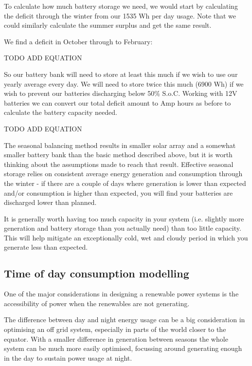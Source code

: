 \documentclass{article}
\theoremstyle{definition}
\theoremstyle{definition}
\theoremstyle{remark}
\begin{document}
    To calculate how much battery storage we need, we would start by calculating the deficit through the winter from our 1535 Wh per day usage. Note that we could similarly calculate the summer surplus and get the same result.

    We find a deficit in October through to February:

    TODO ADD EQUATION

    So our battery bank will need to store at least this much if we wish to use our yearly average every day. We will need to store twice this much (6900 Wh) if we wish to prevent our batteries discharging below 50\% S.o.C. Working with 12V batteries we can convert our total deficit amount to Amp hours as before to calculate the battery capacity needed.

    TODO ADD EQUATION

    The seasonal balancing method results in smaller solar array and a somewhat smaller battery bank than the basic method described above, but it is worth thinking about the assumptions made to reach that result. Effective seasonal storage relies on consistent average energy generation and consumption through the winter - if there are a couple of days where generation is lower than expected and/or consumption is higher than expected, you will find your batteries are discharged lower than planned. 

    It is generally worth having too much capacity in your system (i.e. slightly more generation and battery storage than you actually need) than too little capacity. This will help mitigate an exceptionally cold, wet and cloudy period in which you generate less than expected. 
  

  \subsection{Time of day consumption modelling} %
  \label{sub:time_of_day_consumption_modelling}

    One of the major considerations in designing a renewable power systems is the accessibility of power when the renewables are not generating.

    The difference between day and night energy usage can be a big consideration in optimising an off grid system, especially in parts of the world closer to the equator. With a smaller difference in generation between seasons the whole system can be much more easily optimised, focussing around generating enough in the day to sustain power usage at night.
\end{document}
